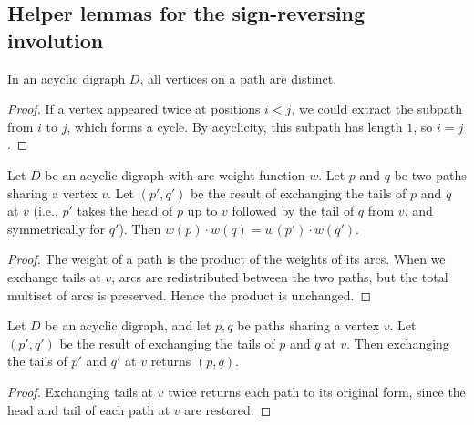 \subsection{Helper lemmas for the sign-reversing involution}

\begin{lemma}
\label{lem.lgv.path-vertices-nodup}
\leanhelper
\leanok
In an acyclic digraph $D$, all vertices on a path are distinct.
\end{lemma}

\begin{proof}
\leanok
If a vertex appeared twice at positions $i < j$, we could extract the
subpath from $i$ to $j$, which forms a cycle.  By acyclicity,
this subpath has length $1$, so $i = j$.
\end{proof}

\begin{lemma}
\label{lem.lgv.exchangeTails.weight}
\leanhelper
\leanok
Let $D$ be an acyclic digraph with arc weight function $w$.
Let $p$ and $q$ be two paths sharing a vertex $v$.  Let $(p', q')$
be the result of exchanging the tails of $p$ and $q$ at $v$
(i.e., $p'$ takes the head of $p$ up to $v$ followed by the tail of $q$
from $v$, and symmetrically for $q'$).  Then
$w(p) \cdot w(q) = w(p') \cdot w(q')$.
\end{lemma}

\begin{proof}
The weight of a path is the product of the weights of its arcs.
When we exchange tails at $v$, arcs are redistributed between the two
paths, but the total multiset of arcs is preserved.  Hence the product
is unchanged.
\end{proof}

\begin{lemma}
\label{lem.lgv.exchangeTails.involutive}
\leanhelper
\leanok
Let $D$ be an acyclic digraph, and let $p, q$ be paths sharing a
vertex $v$.  Let $(p', q')$ be the result of exchanging the tails of $p$ and $q$ at $v$.
Then exchanging the tails of $p'$ and $q'$ at $v$ returns $(p, q)$.
\end{lemma}

\begin{proof}
\leanok
Exchanging tails at $v$ twice returns each path to its original form,
since the head and tail of each path at $v$ are restored.
\end{proof}

